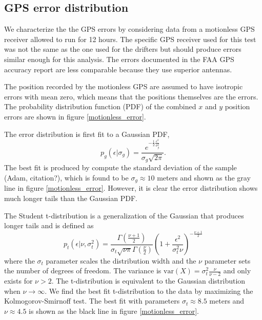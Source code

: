 \documentclass[10pt,journal]{IEEEtran}
\begin{document}
%
\subsection{GPS error distribution}
%

We characterize the the GPS errors by considering data from a motionless GPS receiver allowed to run for 12 hours. The specific GPS receiver used for this test was not the same as the one used for the drifters but should produce errors similar enough for this analysis. The errors documented in the FAA GPS accuracy report \cite{faa2016-report} are less comparable because they use superior antennas.

The position recorded by the motionless GPS are assumed to have isotropic errors with mean zero, which means that the positions themselves are the errors. The probability distribution function (PDF) of the combined $x$ and $y$ position errors are shown in figure \ref{motionless_error}.

The error distribution is first fit to a Gaussian PDF,
\begin{equation}
p_g(\epsilon|\sigma_g) = \frac{e^{-\frac{1}{2}\frac{\epsilon^2}{\sigma_g^2}} }{\sigma_g \sqrt{ 2 \pi}}.
\end{equation}
The best fit is produced by compute the standard deviation of the sample (Adam, citation?), which is found to be $\sigma_g \approx 10$ meters and shown as the gray line in figure \ref{motionless_error}. However, it is clear the error distribution shows much longer tails than the Gaussian PDF.

The Student t-distribution is a generalization of the Gaussian that produces longer tails and is defined as 
\begin{equation}
\label{student_pdf}
p_t\left(\epsilon |\nu,\sigma_t^2\right) = \frac{\Gamma\left( \frac{\nu + 1}{2} \right)}{\sigma_t \sqrt{\nu \pi} \Gamma\left(\frac{\nu}{2}\right)} \left( 1 + \frac{\epsilon^2}{\sigma_t^2 \nu} \right)^{-\frac{\nu+1}{2}}
\end{equation}
where the $\sigma_t$ parameter scales the distribution width and the $\nu$ parameter sets the number of degrees of freedom. The variance is $\textrm{var}(X)=\sigma_t^2 \frac{\nu}{\nu-2}$ and only exists for $\nu > 2$. The t-distribution is equivalent to the Gaussian distribution when $\nu \rightarrow \infty$. We find the best fit t-distribution to the data by maximizing the Kolmogorov-Smirnoff test. The best fit with parameters $\sigma_t \approx 8.5$ meters and $\nu \approx 4.5$ is shown as the black line in figure \ref{motionless_error}.
\end{document}
